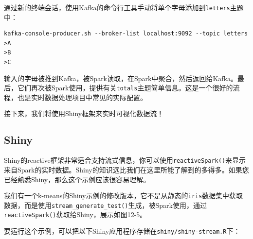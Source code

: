 \documentclass[
]{article}
\begin{document}
通过新的终端会话，使用Kafka的命令行工具手动将单个字母添加到\texttt{letters}主题中：

\begin{verbatim}
kafka-console-producer.sh --broker-list localhost:9092 --topic letters
>A
>B
>C
\end{verbatim}

输入的字母被推到Kafka，被Spark读取，在Spark中聚合，然后返回给Kafka。最后，它们再次被Spark使用，提供有关\texttt{totals}主题简单信息。这是一个很好的流程，也是实时数据处理项目中常见的实际配置。

接下来，我们将使用Shiny框架来实时可视化数据流！

\hypertarget{shiny}{%
\subsection{Shiny}\label{shiny}}

Shiny的reactive框架非常适合支持流式信息，你可以使用\texttt{reactiveSpark()}来显示来自Spark的实时数据。Shiny的知识远比我们在这里所能了解到的多得多。如果您已经熟悉Shiny，那么这个示例应该很容易理解。

我们有一个k-means的Shiny示例的修改版本，它不是从静态的\texttt{iris}数据集中获取数据，而是使用\texttt{stream\_generate\_test()}生成，被Spark使用，通过\texttt{reactiveSpark()}获取给Shiny，展示如图12-5。

要运行这个示例，可以把以下Shiny应用程序存储在\texttt{shiny/shiny-stream.R}下：
\end{document}
